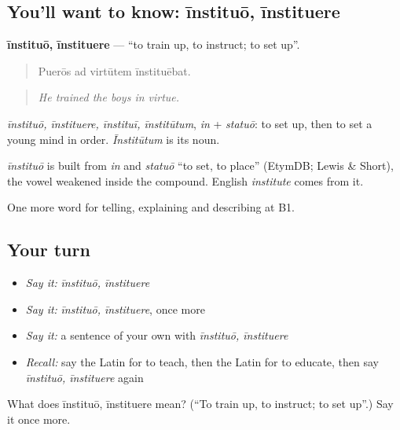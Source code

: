 \subsection*{You'll want to know: īnstituō, īnstituere}
\textbf{īnstituō, īnstituere} — \textquotedblleft{}to train up, to instruct; to set up\textquotedblright{}.

\begin{quote}
Puerōs ad virtūtem īnstituēbat.
\end{quote}

\begin{quote}
\emph{He trained the boys in virtue.}
\end{quote}

\emph{īnstituō, īnstituere, īnstituī, īnstitūtum}, \emph{in} + \emph{statuō}: to set up, then to set a young mind in order. \emph{Īnstitūtum} is its noun.

\begin{cousinweb}
\emph{īnstituō} is built from \emph{in} and \emph{statuō} \textquotedblleft{}to set, to place\textquotedblright{} (EtymDB; Lewis \& Short), the vowel weakened inside the compound. English \emph{institute} comes from it.
\end{cousinweb}

\begin{grammarlens}[title={What you've built}]
One more word for telling, explaining and describing at B1.
\end{grammarlens}

\subsection*{Your turn}
\begin{itemize}
\raggedright
  \item \emph{Say it:} \emph{īnstituō, īnstituere}
  \item \emph{Say it:} \emph{īnstituō, īnstituere}, once more
  \item \emph{Say it:} a sentence of your own with \emph{īnstituō, īnstituere}
  \item \emph{Recall:} say the Latin for to teach, then the Latin for to educate, then say \emph{īnstituō, īnstituere} again
\end{itemize}

\begin{tcolorbox}[breakable,colback=teal!4,colframe=teal!35!black,title={Before you move on}]
What does īnstituō, īnstituere mean? (\textquotedblleft{}To train up, to instruct; to set up\textquotedblright{}.) Say it once more.
\end{tcolorbox}

